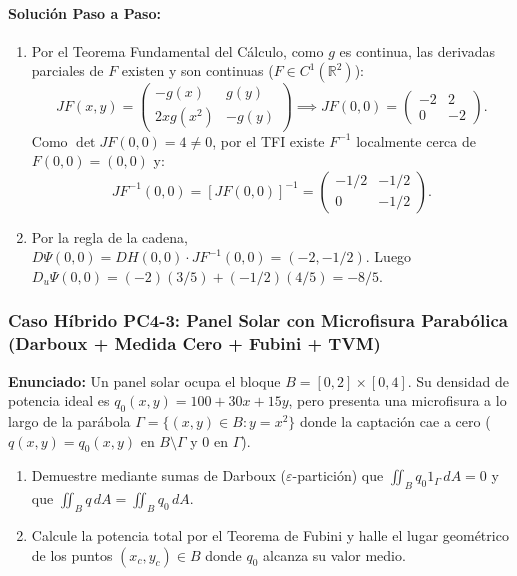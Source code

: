 \documentclass[11pt,a4paper]{article}
\begin{document}
\paragraph{Solución Paso a Paso:}
\begin{enumerate}[label=\textbf{\alph*)}]
  \item Por el Teorema Fundamental del Cálculo, como $g$ es continua, las derivadas parciales de $F$ existen y son continuas ($F \in C^1(\mathbb{R}^2)$):
  \[ JF(x,y) = \begin{pmatrix} -g(x) & g(y) \\ 2x g(x^2) & -g(y) \end{pmatrix} \implies JF(0,0) = \begin{pmatrix} -2 & 2 \\ 0 & -2 \end{pmatrix}. \]
  Como $\det JF(0,0) = 4 \neq 0$, por el TFI existe $F^{-1}$ localmente cerca de $F(0,0)=(0,0)$ y:
  \[ JF^{-1}(0,0) = [JF(0,0)]^{-1} = \begin{pmatrix} -1/2 & -1/2 \\ 0 & -1/2 \end{pmatrix}. \]
  \item Por la regla de la cadena, $D\Psi(0,0) = DH(0,0)\cdot JF^{-1}(0,0) = (-2, -1/2)$. Luego $D_u\Psi(0,0) = (-2)(3/5) + (-1/2)(4/5) = -8/5$.
\end{enumerate}

\subsubsection*{Caso Híbrido PC4-3: Panel Solar con Microfisura Parabólica (Darboux + Medida Cero + Fubini + TVM)}
\begin{tcolorbox}[colback=white,colframe=gray!40,arc=1mm,boxrule=0.5pt]
\textbf{Enunciado:} Un panel solar ocupa el bloque $B = [0,2]\times[0,4]$. Su densidad de potencia ideal es $q_0(x,y) = 100 + 30x + 15y$, pero presenta una microfisura a lo largo de la parábola $\Gamma = \{(x,y)\in B : y = x^2\}$ donde la captación cae a cero ($q(x,y) = q_0(x,y)$ en $B\setminus\Gamma$ y $0$ en $\Gamma$).
\begin{enumerate}[label=\textbf{\alph*)}]
  \item Demuestre mediante sumas de Darboux ($\varepsilon$-partición) que $\iint_B q_0 1_\Gamma\,dA = 0$ y que $\iint_B q\,dA = \iint_B q_0\,dA$.
  \item Calcule la potencia total por el Teorema de Fubini y halle el lugar geométrico de los puntos $(x_c, y_c) \in B$ donde $q_0$ alcanza su valor medio.
\end{enumerate}
\end{tcolorbox}
\end{document}
